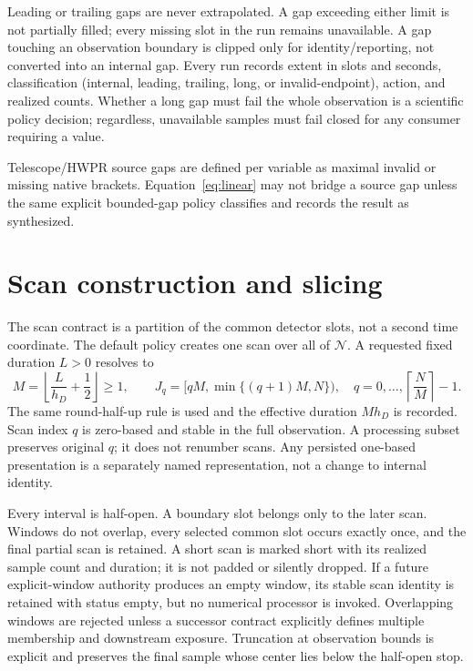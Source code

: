 \documentclass[11pt]{article}
\newcommand{\state}[1]{\mathrm{#1}}
\begin{document}
Leading or trailing gaps are never extrapolated.  A gap exceeding either
limit is not partially filled; every missing slot in the run remains
unavailable.  A gap touching an observation boundary is clipped only for
identity/reporting, not converted into an internal gap.  Every run records
extent in slots and seconds, classification (internal, leading, trailing,
long, or invalid-endpoint), action, and realized counts.  Whether a long gap
must fail the whole observation is a scientific policy decision; regardless,
unavailable samples must fail closed for any consumer requiring a value.

Telescope/HWPR source gaps are defined per variable as maximal invalid or
missing native brackets.  Equation~\eqref{eq:linear} may not bridge a source
gap unless the same explicit bounded-gap policy classifies and records the
result as synthesized.

\section{Scan construction and slicing}

The scan contract is a partition of the common detector slots, not a second
time coordinate.  The default policy creates one scan over all of
\(\mathcal N\).  A requested fixed duration \(L>0\) resolves to
\begin{equation}
 M=\left\lfloor\frac{L}{h_D}+\frac12\right\rfloor\geq1,\qquad
 J_q=[qM,\min\{(q+1)M,N\}),\quad q=0,\ldots,\left\lceil\frac NM\right\rceil-1.
 \label{eq:scans}
\end{equation}
The same round-half-up rule is used and the effective duration \(Mh_D\) is
recorded.  Scan index \(q\) is zero-based and stable in the full observation.
A processing subset preserves original \(q\); it does not renumber scans.
Any persisted one-based presentation is a separately named representation,
not a change to internal identity.

Every interval is half-open.  A boundary slot belongs only to the later
scan.  Windows do not overlap, every selected common slot occurs exactly
once, and the final partial scan is retained.  A short scan is marked short
with its realized sample count and duration; it is not padded or silently
dropped.  If a future explicit-window authority produces an empty window, its
stable scan identity is retained with status \(\state{empty}\), but no numerical
processor is invoked.  Overlapping windows are rejected unless a successor
contract explicitly defines multiple membership and downstream exposure.
Truncation at observation bounds is explicit and preserves the final sample
whose center lies below the half-open stop.
\end{document}
